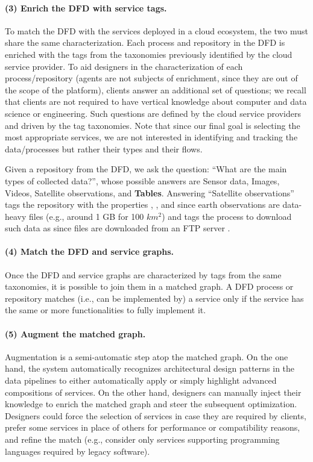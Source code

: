 \paragraph{(3) Enrich the DFD with service tags.}
To match the DFD with the services deployed in a cloud ecosystem, the two must share the same characterization. Each process and repository in the DFD is enriched with the tags from the taxonomies previously identified by the cloud service provider. To aid designers in the characterization of each process/repository (agents are not subjects of enrichment, since they are out of the scope of the platform), clients answer an additional set of questions; we recall that clients are not required to have vertical knowledge about computer and data science or engineering. Such questions are defined by the cloud service providers and driven by the tag taxonomies. Note that since our final goal is selecting the most appropriate services, we are not interested in identifying and tracking the data/processes but rather their types and their flows.

\begin{example}
Given a repository from the DFD, we ask the question: ``What are the main types of collected data?'', whose possible answers are Sensor data, Images, Videos, Satellite observations, and \textbf{Tables}. Answering ``Satellite observations'' tags the repository with the properties , , and  since earth observations are data-heavy files (e.g., around 1 GB for 100 $km^2$) and tags the process to download such data as  since files are downloaded from an FTP server \cite{esa-eo}.
\end{example}

\paragraph{(4) Match the DFD and service graphs.}
Once the DFD and service graphs are characterized by tags from the same taxonomies, it is possible to join them in a matched graph. A DFD process or repository matches (i.e., can be implemented by) a service only if the service has the same or more functionalities to fully implement it.

\paragraph{(5) Augment the matched graph.}
Augmentation is a semi-automatic step atop the matched graph. On the one hand, the system automatically recognizes architectural design patterns in the data pipelines to either automatically apply or simply highlight advanced compositions of services. On the other hand, designers can manually inject their knowledge to enrich the matched graph and steer the subsequent optimization. Designers could force the selection of services in case they are required by clients, prefer some services in place of others for performance or compatibility reasons, and refine the match (e.g., consider only services supporting programming languages required by legacy software).

